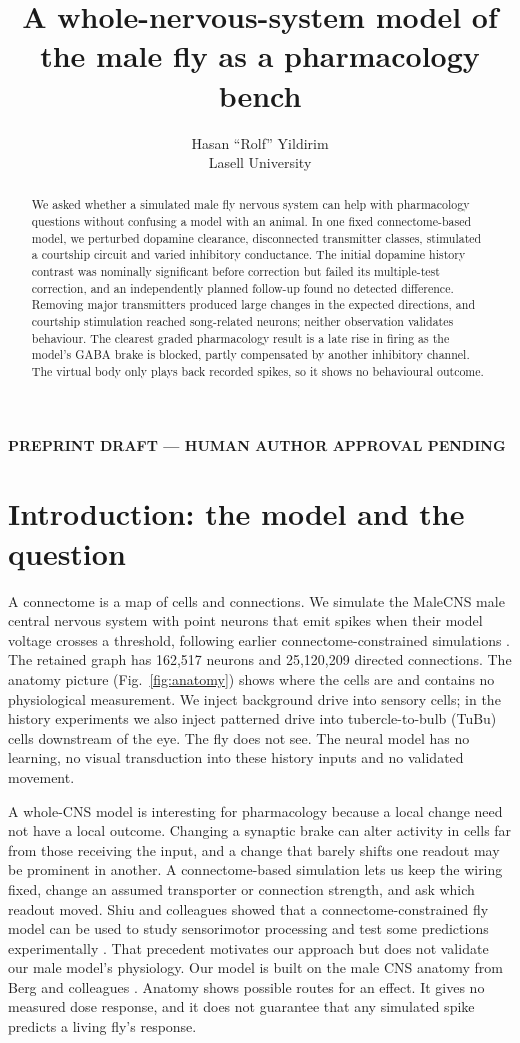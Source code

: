 \documentclass[11pt]{article}
\title{A whole-nervous-system model of the male fly as a pharmacology bench}
\author{Hasan ``Rolf'' Yildirim\\Lasell University}
\date{}\hypersetup{pdftitle={A whole-nervous-system model of the male fly as a pharmacology bench},pdfauthor={Hasan "Rolf" Yildirim}}
\newif\iffinal
\newcommand{\paperstatus}{PREPRINT DRAFT --- HUMAN AUTHOR APPROVAL PENDING}
\begin{document}
\maketitle
\iffinal\else
\begin{center}\small\bfseries\color{pending}\paperstatus\end{center}
\fi
\begin{abstract}
We asked whether a simulated male fly nervous system can help with pharmacology questions without confusing a model with an animal. In one fixed connectome-based model, we perturbed dopamine clearance, disconnected transmitter classes, stimulated a courtship circuit and varied inhibitory conductance. The initial dopamine history contrast was nominally significant before correction but failed its multiple-test correction, and an independently planned follow-up found no detected difference. Removing major transmitters produced large changes in the expected directions, and courtship stimulation reached song-related neurons; neither observation validates behaviour. The clearest graded pharmacology result is a late rise in firing as the model's GABA brake is blocked, partly compensated by another inhibitory channel. The virtual body only plays back recorded spikes, so it shows no behavioural outcome.
\end{abstract}

\section*{Introduction: the model and the question}
A connectome is a map of cells and connections. We simulate the MaleCNS male central nervous system \cite{berg} with point neurons that emit spikes when their model voltage crosses a threshold, following earlier connectome-constrained simulations \cite{shiu}. The retained graph has 162,517 neurons and 25,120,209 directed connections. The anatomy picture (Fig.~\ref{fig:anatomy}) shows where the cells are and contains no physiological measurement. We inject background drive into sensory cells; in the history experiments we also inject patterned drive into tubercle-to-bulb (TuBu) cells downstream of the eye. The fly does not see. The neural model has no learning, no visual transduction into these history inputs and no validated movement.

A whole-CNS model is interesting for pharmacology because a local change need not have a local outcome. Changing a synaptic brake can alter activity in cells far from those receiving the input, and a change that barely shifts one readout may be prominent in another. A connectome-based simulation lets us keep the wiring fixed, change an assumed transporter or connection strength, and ask which readout moved. Shiu and colleagues showed that a connectome-constrained fly model can be used to study sensorimotor processing and test some predictions experimentally \cite{shiu}. That precedent motivates our approach but does not validate our male model's physiology. Our model is built on the male CNS anatomy from Berg and colleagues \cite{berg}. Anatomy shows possible routes for an effect. It gives no measured dose response, and it does not guarantee that any simulated spike predicts a living fly's response.
\end{document}
